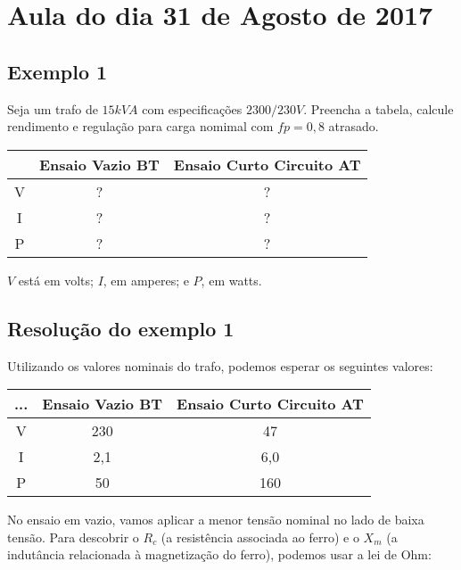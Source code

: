 \documentclass[12pt, a4paper, twoside]{article}
\begin{document}
\section{Aula do dia 31 de Agosto de 2017}


\subsection{Exemplo 1}

Seja um trafo de $15kVA$ com especificações $2300/230V$. Preencha a tabela, calcule rendimento e regulação para carga nomimal com $fp = 0,8$ atrasado.

\begin{center}
    \begin{tabular}{ | c | c | c | }
        \hline
         & Ensaio Vazio BT & Ensaio Curto Circuito AT \\ \hline
        V   & ? & ? \\ \hline
        I   & ? & ? \\ \hline
        P   & ? & ? \\ \hline
    \end{tabular}
\end{center}

$V$ está em volts; $I$, em amperes; e $P$, em watts.

\subsection{Resolução do exemplo 1}

Utilizando os valores nominais do trafo, podemos esperar os seguintes valores:

\begin{center}
    \begin{tabular}{ | c | c | c | }
        \hline
        ... & Ensaio Vazio BT & Ensaio Curto Circuito AT \\ \hline
        V   & 230             & 47                       \\ \hline
        I   & 2,1             & 6,0                      \\ \hline
        P   & 50              & 160                      \\ \hline
    \end{tabular}
\end{center}

No ensaio em vazio, vamos aplicar a menor tensão nominal no lado de baixa tensão. Para descobrir o $R_c$ (a resistência associada ao ferro) e o $X_m$ (a indutância relacionada à magnetização do ferro), podemos usar a lei de Ohm:
\end{document}
